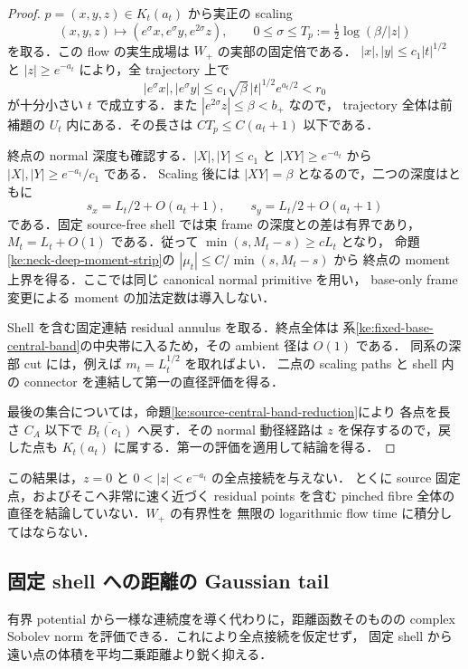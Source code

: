 \begin{proof}
$p=(x,y,z)\in K_t(a_t)$ から実正の scaling
\[
 (x,y,z)\longmapsto(e^\sigma x,e^\sigma y,e^{2\sigma}z),
 \qquad 0\le\sigma\le T_p:=\tfrac12\log(\beta/|z|)
\]
を取る．この flow の実生成場は $W_+$ の実部の固定倍である．
$|x|,|y|\le c_1|t|^{1/2}$ と $|z|\ge e^{-a_t}$ により，全 trajectory 上で
\[
 |e^\sigma x|,|e^\sigma y|
 \le c_1\sqrt\beta\,|t|^{1/2}e^{a_t/2}<r_0
\]
が十分小さい $t$ で成立する．また $|e^{2\sigma}z|\le\beta<b_+$ なので，
trajectory 全体は前補題の $U_t$ 内にある．その長さは
$CT_p\le C(a_t+1)$ 以下である．

終点の normal 深度も確認する．$|X|,|Y|\le c_1$ と
$|XY|\ge e^{-a_t}$ から $|X|,|Y|\ge e^{-a_t}/c_1$ である．
Scaling 後には $|XY|=\beta$ となるので，二つの深度はともに
\[
 s_x=L_t/2+O(a_t+1),\qquad s_y=L_t/2+O(a_t+1)
\]
である．固定 source-free shell では束 frame の深度との差は有界であり，
$M_t=L_t+O(1)$ である．従って $\min(s,M_t-s)\ge cL_t$ となり，
命題\ref{ke:neck-deep-moment-strip}の $|\mu_t|\le C/\min(s,M_t-s)$ から
終点の moment 上界を得る．ここでは同じ canonical normal primitive を用い，
base-only frame 変更による moment の加法定数は導入しない．

Shell を含む固定連結 residual annulus を取る．終点全体は
系\ref{ke:fixed-base-central-band}の中央帯に入るため，その ambient 径は $O(1)$ である．
同系の深部 cut には，例えば $m_t=L_t^{1/2}$ を取ればよい．
二点の scaling paths と shell 内の connector を連結して第一の直径評価を得る．

最後の集合については，命題\ref{ke:source-central-band-reduction}により
各点を長さ $C_A$ 以下で $\overline{B_t(c_1)}$ へ戻す．その normal 動径経路は
$z$ を保存するので，戻した点も $K_t(a_t)$ に属する．第一の評価を適用して結論を得る．
\end{proof}

この結果は，$z=0$ と $0<|z|<e^{-a_t}$ の全点接続を与えない．
とくに source 固定点，およびそこへ非常に速く近づく residual points を含む
pinched fibre 全体の直径を結論していない．$W_+$ の有界性を
無限の logarithmic flow time に積分してはならない．

\subsection{固定 shell への距離の Gaussian tail}

有界 potential から一様な連続度を導く代わりに，距離函数そのものの
complex Sobolev norm を評価できる．これにより全点接続を仮定せず，
固定 shell から遠い点の体積を平均二乗距離より鋭く抑える．

